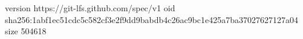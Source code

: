 version https://git-lfs.github.com/spec/v1
oid sha256:1abf1ec51cdc5c582cf3e2f9dd9babdb4c26ac9bc1e425a7ba37027627127a04
size 504618
